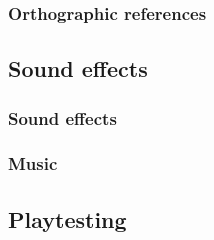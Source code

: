 \documentclass{article}[10pt]
\begin{document}
\paragraph{}
\subsubsection{Orthographic references}
\paragraph{}

\subsection{Sound effects}
\subsubsection{Sound effects}
\paragraph{}
\subsubsection{Music}
\paragraph{}

\subsection{Playtesting}
\end{document}
